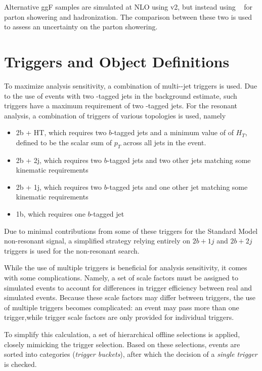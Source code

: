 Alternative ggF samples are simulated at NLO using \POWHEGBOX v2, but instead using \HERWIG[7]~\cite{Herwigpp} 
for parton showering and hadronization. The comparison between these two is used to assess an uncertainty 
on the parton showering.


\section{Triggers and Object Definitions}
\label{sec:trigger}
To maximize analysis sensitivity, a combination of multi-\Pqb-jet triggers is used. Due to the 
use of events with two \Pqb-tagged jets in the background estimate, such triggers have a maximum 
requirement of two \Pqb-tagged jets. For the resonant analysis, a combination of triggers of 
various topologies is used, namely
\begin{itemize}
	\item 2b + HT, which requires two $b$-tagged jets and a minimum value of of $H_{T}$, defined to be the scalar sum of $p_{T}$ across all jets in the event.
	\item 2b + 2j, which requires two $b$-tagged jets and two other jets matching some kinematic requirements
	\item 2b + 1j, which requires two $b$-tagged jets and one other jet matching some kinematic requirements
	\item 1b, which requires one $b$-tagged jet
\end{itemize}
Due to minimal contributions from some of these triggers for the Standard Model non-resonant signal, a simplified strategy relying entirely on $2b+1j$ and $2b+2j$ triggers is used for the non-resonant search.

While the use of multiple triggers is beneficial for analysis sensitivity, it comes with some
complications. Namely, a set of scale factors must be assigned to simulated events to 
account for differences in trigger efficiency between real and simulated events. Because these scale 
factors may differ between triggers, the use of multiple triggers becomes complicated: an event may pass 
more than one trigger,while trigger scale factors are only provided for individual triggers.

To simplify this calculation, a set of hierarchical offline selections is applied, closely 
mimicking the trigger selection. Based on these selections, events are sorted into categories
(\emph{trigger buckets}), after which the decision of a \emph{single trigger} is checked. 

